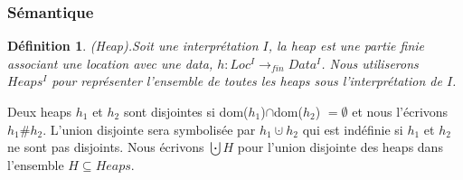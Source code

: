 \documentclass[11pt,openany]{article}
\newtheorem{definition}{D\'efinition}[subsection]
\begin{document}
	\subsubsection{S\'emantique}
	\begin{definition}
	(Heap).Soit une interpr\'etation $I$, la heap est une partie finie associant une location avec une data, $h : Loc^{I} \rightarrow_{fin} Data^{I}$. Nous utiliserons $Heaps^{I}$ pour repr\'esenter l'ensemble de toutes les heaps sous l'interpr\'etation de $I$.
	\end{definition}
	Deux heaps $h_{1}$ et $h_{2}$ sont disjointes si dom($h_{1}$)$\cap$dom($h_{2}$) $= \emptyset$ et nous l'\'ecrivons $h_{1}\#h_{2}$. L'union disjointe sera symbolis\'ee par $h_{1}\cupdot h_{2}$ qui est ind\'efinie si $h_{1}$ et $h_{2}$ ne sont pas disjoints. Nous \'ecrivons $\bigcupdot H$ pour l'union disjointe des heaps dans l'ensemble $H \subseteq Heaps$.
\end{document}
